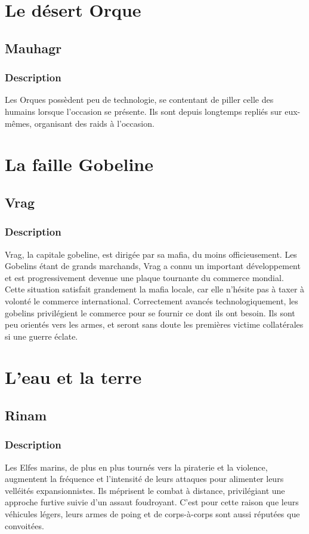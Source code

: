 \section{Le désert Orque}
\subsection{Mauhagr}
\subsubsection{Description}
Les Orques possèdent peu de technologie, se contentant de piller celle des humains lorsque l'occasion se présente. Ils sont depuis longtemps repliés sur eux-mêmes, organisant des raids à l'occasion.
\section{La faille Gobeline}
\subsection{Vrag}
\subsubsection{Description}
Vrag, la capitale gobeline, est dirigée par sa mafia, du moins officieusement. Les Gobelins étant de grands marchands, Vrag a connu un important développement et est progressivement devenue une plaque tournante du commerce mondial. Cette situation satisfait grandement la mafia locale, car elle n'hésite pas à taxer à volonté le commerce international. Correctement avancés technologiquement, les gobelins privilégient le commerce pour se fournir ce dont ils ont besoin. Ils sont peu orientés vers les armes, et seront sans doute les premières victime collatérales si une guerre éclate.
\section{L'eau et la terre}
\subsection{Rinam}
\subsubsection{Description}
Les Elfes marins, de plus en plus tournés vers la piraterie et la violence, augmentent la fréquence et l'intensité de leurs attaques pour alimenter leurs velléités expansionnistes. Ils méprisent le combat à distance, privilégiant une approche furtive suivie d'un assaut foudroyant. C'est pour cette raison que leurs véhicules légers, leurs armes de poing et de corps-à-corps sont aussi réputées que convoitées.

